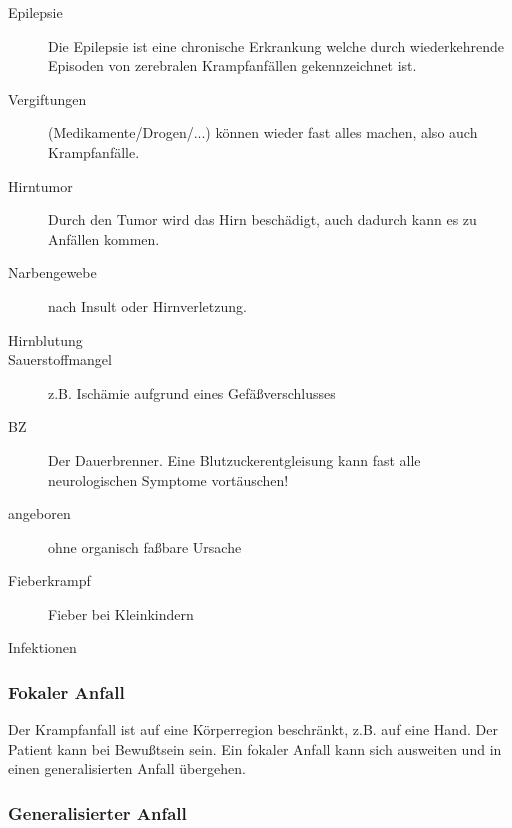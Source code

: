 \begin{description}
    \item[Epilepsie]Die Epilepsie ist eine chronische
    Erkrankung welche durch wiederkehrende Episoden von zerebralen Krampfanfällen gekennzeichnet ist.
    \item[Vergiftungen](Medikamente/Drogen/...) können
    wieder fast alles machen, also auch Krampfanfälle.
    \cite{Supady2009}
    \item[Hirntumor] Durch den Tumor wird das Hirn beschädigt, auch dadurch kann es zu Anfällen kommen.
    \item[Narbengewebe] nach Insult oder Hirnverletzung.
    \item[Hirnblutung]
    \item[Sauerstoffmangel] z.B. Ischämie aufgrund eines Gefäßverschlusses
    \item[BZ] Der Dauerbrenner. Eine Blutzuckerentgleisung kann fast alle neurologischen Symptome vortäuschen!
    \item[angeboren] ohne organisch faßbare  Ursache
    \item[Fieberkrampf] Fieber bei Kleinkindern
    \item[Infektionen]
\end{description}

\subsubsection{Fokaler
Anfall}\label{topic:krampfanfall-fokaler}
Der Krampfanfall ist auf eine Körperregion beschränkt, z.B.
auf eine Hand. Der Patient kann bei Bewußtsein sein. Ein
fokaler Anfall kann sich ausweiten und in einen
generalisierten Anfall übergehen. 
      


\subsubsection{Generalisierter
Anfall}\label{topic:krampfanfall-generalisierter}


